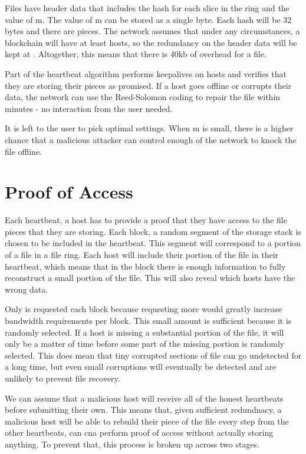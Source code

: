\documentclass[twocolumn]{article}
\begin{document}
Files have header data that includes the hash for each slice in the ring and the value of m.
The value of m can be stored as a single byte.
Each hash will be 32 bytes and there are \numhosts pieces.
The network assumes that under any circumstances, a blockchain will have at least \inversemaxcorruption hosts, so the redundancy on the header data will be kept at \maxredundancy.
Altogether, this means that there is 40kb of overhead for a file.

Part of the heartbeat algorithm performs keepalives on hosts and verifies that they are storing their pieces as promised.
If a host goes offline or corrupts their data, the network can use the Reed-Solomon coding to repair the file within minutes - no interaction from the user needed.

It is left to the user to pick optimal settings.
When m is small, there is a higher chance that a malicious attacker can control enough of the network to knock the file offline.

\section{Proof of Access}

Each heartbeat, a host has to provide a proof that they have access to the file pieces that they are storing.
Each block, a random \filechecksize{} segment of the storage stack is chosen to be included in the heartbeat.
This segment will correspond to a portion of a file in a file ring.
Each host will include their portion of the file in their heartbeat, which means that in the block there is enough information to fully reconstruct a small portion of the file.
This will also reveal which hosts have the wrong data.

Only \filechecksize{} is requested each block because requesting more would greatly increase bandwidth requirements per block.
This small amount is sufficient because it is randomly selected.
If a host is missing a substantial portion of the file, it will only be a matter of time before some part of the missing portion is randomly selected.
This does mean that tiny corrupted sections of file can go undetected for a long time, but even small corruptions will eventually be detected and are unlikely to prevent file recovery.

We can assume that a malicious host will receive all of the honest heartbeats before submitting their own.
This means that, given sufficient redundnacy, a malicious host will be able to rebuild their piece of the file every step from the other heartbeats, can cna perform proof of access without actually storing anything.
To prevent that, this process is broken up across two stages.
\end{document}
